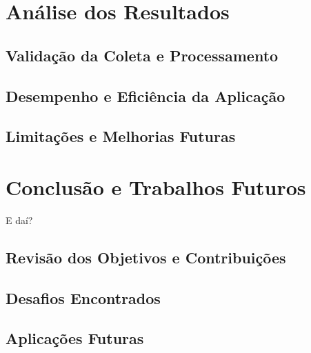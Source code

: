 \documentclass[12pt, %
openright, 
oneside, %
a4paper,    %
brazil]{facom-ufu-abntex2}
\begin{document}

\chapter{Análise dos Resultados}
\section{Validação da Coleta e Processamento}
\section{Desempenho e Eficiência da Aplicação}
\section{Limitações e Melhorias Futuras}





\chapter{Conclusão e Trabalhos Futuros}
E daí?
\section{Revisão dos Objetivos e Contribuições}
\section{Desafios Encontrados}
\section{Aplicações Futuras}





\postextual





\end{document}
